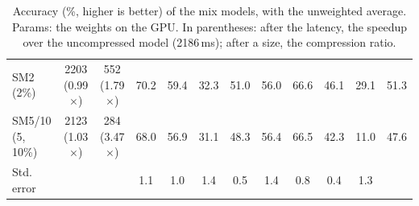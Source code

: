 \documentclass[11pt]{article}
\begin{document}
\begin{table}[!ht]
\begin{tabular}{lccccccccccc}
SM2 (2\%) & 2203 (0.99$\times$) & 552 (1.79$\times$) & 70.2 & 59.4 & 32.3 & 51.0 & 56.0 & 66.6 & 46.1 & 29.1 & 51.3 \\
SM5/10 (5, 10\%) & 2123 (1.03$\times$) & 284 (3.47$\times$) & 68.0 & 56.9 & 31.1 & 48.3 & 56.4 & 66.5 & 42.3 & 11.0 & 47.6 \\
\midrule
Std. error & & & 1.1 & 1.0 & 1.4 & 0.5 & 1.4 & 0.8 & 0.4 & 1.3 &  \\
\bottomrule
\end{tabular}
\caption{Accuracy (\%, higher is better) of the mix models, with the unweighted average. Params: the weights on the GPU. In parentheses: after the latency, the speedup over the uncompressed model (2186\,ms); after a size, the compression ratio.}
\label{tab:turnresults}
\end{table}
\end{document}
